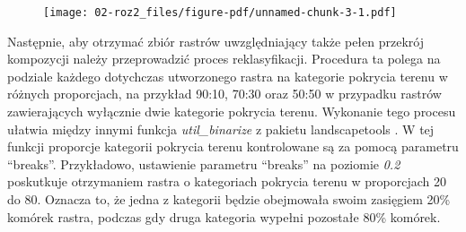 \documentclass{amuthesis}
\begin{document}
\begin{figure}[t]

{\centering \texttt{[image: 02-roz2\_files/figure-pdf/unnamed-chunk-3-1.pdf]}

}

\end{figure}

Następnie, aby otrzymać zbiór rastrów uwzględniający także pełen
przekrój kompozycji należy przeprowadzić proces reklasyfikacji.
Procedura ta polega na podziale każdego dotychczas utworzonego rastra na
kategorie pokrycia terenu w różnych proporcjach, na przykład 90:10,
70:30 oraz 50:50 w przypadku rastrów zawierających wyłącznie dwie
kategorie pokrycia terenu. Wykonanie tego procesu ułatwia między innymi
funkcja \emph{util\_binarize} z pakietu landscapetools
\autocite{NLMR2018}. W tej funkcji proporcje kategorii pokrycia terenu
kontrolowane są za pomocą parametru ``breaks''. Przykładowo, ustawienie
parametru ``breaks'' na poziomie \emph{0.2} poskutkuje otrzymaniem
rastra o kategoriach pokrycia terenu w proporcjach 20 do 80. Oznacza to,
że jedna z kategorii będzie obejmowała swoim zasięgiem 20\% komórek
rastra, podczas gdy druga kategoria wypełni pozostałe 80\% komórek.

\begin{Shaded}
\begin{Highlighting}[]

\OtherTok{=}\SpecialCharTok{::} \NormalTok{)}
\OtherTok{=}\SpecialCharTok{::} \NormalTok{)}

\OtherTok{=}\SpecialCharTok{::} \NormalTok{)}
\OtherTok{=}\SpecialCharTok{::} \NormalTok{)}

\OtherTok{=}\SpecialCharTok{::}

\end{Highlighting}
\end{Shaded}
\end{document}
